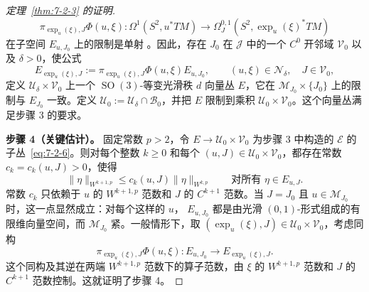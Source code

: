 \begin{proof}[定理~\ref{thm:7-2-3} 的证明]
\[
  \pi_{\exp_u(\xi),J}\Phi(u,\xi):
  \Omega^1(S^2,u^*TM)
  \longrightarrow
  \Omega_J^{0,1}(S^2,\exp_u(\xi)^*TM)
\]
在子空间 $E_{u,J_0}$ 上的限制是单射
。因此，存在 $J_0$ 在 $\mathcal J$ 中的一个 $C^0$ 开邻域
$\mathcal V_0$ 以及 $\delta>0$，使公式
\begin{equation}\label{eq:7-2-6}
  E_{\exp_u(\xi),J}
  :=\pi_{\exp_u(\xi),J}\Phi(u,\xi)E_{u,J_0},
  \qquad
  (u,\xi)\in\mathcal N_\delta,
  \quad J\in\mathcal V_0,
\end{equation}
定义 $\mathcal U_\delta\times\mathcal V_0$ 上一个
$\operatorname{SO}(3)$-等变光滑秩 $d$ 向量丛 $E$，它在
$\mathcal M_{J_0}\times\{J_0\}$ 上的限制与 $E_{J_0}$ 一致。定义
$\mathcal U_0:=\mathcal U_\delta\cap\mathcal B_0$，并把 $E$ 限制到乘积
$\mathcal U_0\times\mathcal V_0$。这个向量丛满足步骤 3 的要求。

\medskip
\noindent\textbf{步骤 4（关键估计）。}\quad
固定常数 $p>2$，令 $E\to\mathcal U_0\times\mathcal V_0$ 为步骤 3 中构造的
$\mathcal E$ 的子丛~\eqref{eq:7-2-6}。则对每个整数 $k\geq0$ 和每个
$(u,J)\in\mathcal U_0\times\mathcal V_0$，都存在常数
$c_k=c_k(u,J)>0$，使得
\begin{equation}\label{eq:7-2-7}
  \|\eta\|_{W^{k+1,p}}
  \leq c_k(u,J)\|\eta\|_{W^{k,p}}
  \qquad\text{对所有 }\eta\in E_{u,J}.
\end{equation}
常数 $c_k$ 只依赖于 $u$ 的 $W^{k+1,p}$ 范数和 $J$ 的 $C^{k+1}$ 范数。当
$J=J_0$ 且 $u\in\mathcal M_{J_0}$ 时，这一点显然成立：对每个这样的 $u$，
$E_{u,J_0}$ 都是由光滑 $(0,1)$-形式组成的有限维向量空间，而
$\mathcal M_{J_0}$ 紧。一般情形下，取
$(\exp_u(\xi),J)\in\mathcal U_0\times\mathcal V_0$，考虑同构
\[
  \pi_{\exp_u(\xi),J}\Phi(u,\xi):
  E_{u,J_0}\longrightarrow E_{\exp_u(\xi),J}.
\]
这个同构及其逆在两端 $W^{k+1,p}$ 范数下的算子范数，由 $\xi$ 的
$W^{k+1,p}$ 范数和 $J$ 的 $C^{k+1}$ 范数控制。这就证明了步骤 4。


\end{proof}
